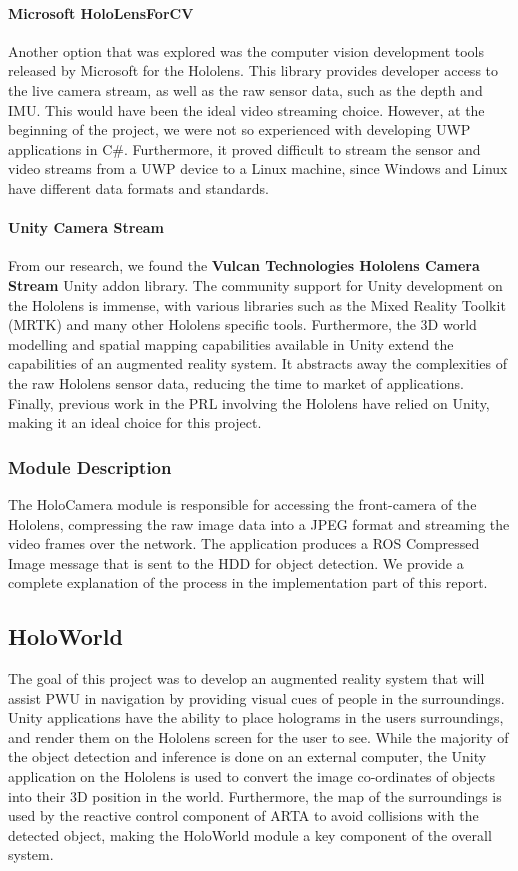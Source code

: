 \paragraph{Microsoft HoloLensForCV} Another option that was explored was the computer vision development tools released by Microsoft for the Hololens. This library provides developer access to the live camera stream, as well as the raw sensor data, such as the depth and IMU. This would have been the ideal video streaming choice. However, at the beginning of the project, we were not so experienced with developing UWP applications in C\#. Furthermore, it proved difficult to stream the sensor and video streams from a UWP device to a Linux machine, since Windows and Linux have different data formats and standards.

\paragraph{Unity Camera Stream} From our research, we found the \textbf{Vulcan Technologies Hololens Camera Stream} Unity addon library. The community support for Unity development on the Hololens is immense, with various libraries such as the Mixed Reality Toolkit (MRTK) and many other Hololens specific tools. Furthermore, the 3D world modelling and spatial mapping capabilities available in Unity extend the capabilities of an augmented reality system. It abstracts away the complexities of the raw Hololens sensor data, reducing the time to market of applications. Finally, previous work in the PRL involving the Hololens have relied on Unity, making it an ideal choice for this project.

\subsubsection{Module Description}
The HoloCamera module is responsible for accessing the front-camera of the Hololens, compressing the raw image data into a JPEG format and streaming the video frames over the network. The application produces a ROS Compressed Image message that is sent to the HDD for object detection. We provide a complete explanation of the process in the implementation part of this report.

\subsection{HoloWorld}
The goal of this project was to develop an augmented reality system that will assist PWU in navigation by providing visual cues of people in the surroundings. Unity applications have the ability to place holograms in the users surroundings, and render them on the Hololens screen for the user to see. While the majority of the object detection and inference is done on an external computer, the Unity application on the Hololens is used to convert the image co-ordinates of objects into their 3D position in the world. Furthermore, the map of the surroundings is used by the reactive control component of ARTA to avoid collisions with the detected object, making the HoloWorld module a key component of the overall system.

